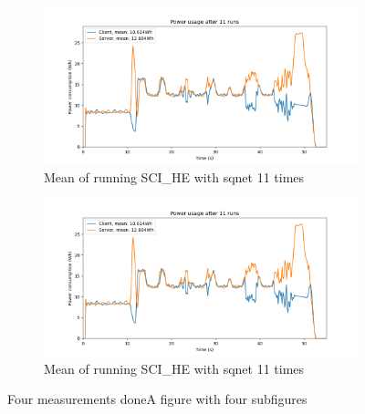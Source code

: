 \documentclass[../thesis.tex]{subfiles}
\begin{document}
\begin{figure}[hbt!]
    \begin{subfigure}{.475\linewidth}
            \includegraphics[width=\textwidth]{Thesis/Images/Means/mean_SCI_HE_sqnet.png}
            \caption{Mean of running SCI\_HE with sqnet 11 times}
            \label{fig:mean_SCI_HE_sqnet}
    \end{subfigure}\hfill %
    \begin{subfigure}{.475\linewidth}
            \includegraphics[width=\textwidth]{Thesis/Images/Means/mean_SCI_HE_sqnet.png}
            \caption{Mean of running SCI\_HE with sqnet 11 times}
            \label{fig:fmean_SCI_HE_sqnet}
    \end{subfigure}

    \caption{Four measurements doneA figure with four subfigures}
    \label{fig:4results}
\end{figure}
\end{document}
